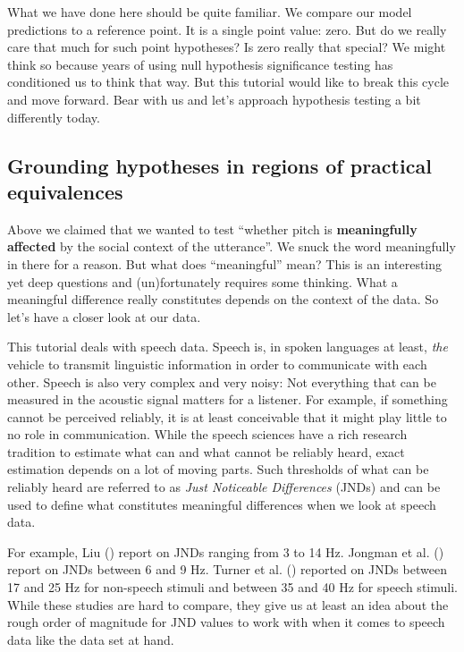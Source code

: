 \documentclass[
  doc,
  floatsintext,
  longtable,
  nolmodern,
  notxfonts,
  notimes,
  colorlinks=true,linkcolor=blue,citecolor=blue,urlcolor=blue]{apa7}
\begin{document}
What we have done here should be quite familiar. We compare our model
predictions to a reference point. It is a single point value: zero. But
do we really care that much for such point hypotheses? Is zero really
that special? We might think so because years of using null hypothesis
significance testing has conditioned us to think that way. But this
tutorial would like to break this cycle and move forward. Bear with us
and let's approach hypothesis testing a bit differently today.

\subsection{Grounding hypotheses in regions of practical
equivalences}\label{grounding-hypotheses-in-regions-of-practical-equivalences}

Above we claimed that we wanted to test ``whether pitch is
\textbf{meaningfully affected} by the social context of the utterance''.
We snuck the word meaningfully in there for a reason. But what does
``meaningful'' mean? This is an interesting yet deep questions and
(un)fortunately requires some thinking. What a meaningful difference
really constitutes depends on the context of the data. So let's have a
closer look at our data.

This tutorial deals with speech data. Speech is, in spoken languages at
least, \emph{the} vehicle to transmit linguistic information in order to
communicate with each other. Speech is also very complex and very noisy:
Not everything that can be measured in the acoustic signal matters for a
listener. For example, if something cannot be perceived reliably, it is
at least conceivable that it might play little to no role in
communication. While the speech sciences have a rich research tradition
to estimate what can and what cannot be reliably heard, exact estimation
depends on a lot of moving parts. Such thresholds of what can be
reliably heard are referred to as \emph{Just Noticeable Differences}
(JNDs) and can be used to define what constitutes meaningful differences
when we look at speech data.

For example, Liu () report on JNDs
ranging from 3 to 14 Hz. Jongman et al.
() report on JNDs between 6 and 9
Hz. Turner et al. () reported
on JNDs between 17 and 25 Hz for non-speech stimuli and between 35 and
40 Hz for speech stimuli. While these studies are hard to compare, they
give us at least an idea about the rough order of magnitude for JND
values to work with when it comes to speech data like the data set at
hand.
\end{document}
